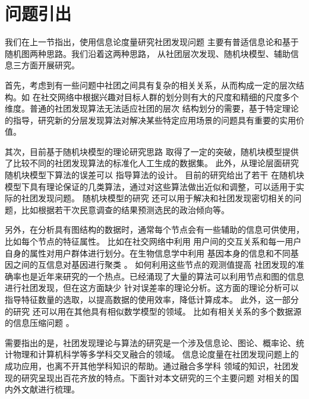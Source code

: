 \section{问题引出}
我们在上一节指出，使用信息论度量研究社团发现问题
主要有普适信息论和基于随机图两种思路。我们沿着这两种思路，
从社团层次发现、随机块模型、辅助信息三方面开展研究。




首先，考虑到有一些问题中社团之间具有复杂的相关关系，从而构成一定的层次结构。如
在社交网络中根据兴趣对目标人群的划分则有大的尺度和精细的尺度多个维度。普通的社团发现算法无法适应社团的层次
结构划分的需要，基于特定理论的指导，研究新的分层发现算法对解决某些特定应用场景的问题具有重要的实用价值。

其次，目前基于随机块模型的理论研究思路
取得了一定的突破，随机块模型提供了比较不同的社团发现算法的标准化人工生成的数据集。
此外，从理论层面研究随机块模型下算法的误差可以
指导算法的设计。
目前的研究给出了若干
在随机块模型下具有理论保证的几类算法，通过对这些算法做出近似和调整，可以适用于实际的社团发现问题。
随机块模型的研究
还可以用于解决和社团发现密切相关的问题，比如根据若干次民意调查的结果预测选民的政治倾向等。

另外，在分析具有图结构的数据时，通常每个节点会有一些辅助的信息可供使用，比如每个节点的特征属性。
比如在社交网络中利用
用户间的交互关系和每一用户自身的属性对用户群体进行划分。在生物信息学中利用
基因本身的信息和不同基因之间的互信息对基因进行聚类 \cite{4359897}。
如何利用这些节点的观测值提高
社团发现的准确率也是近年来研究的一个热点。已经涌现了大量的算法可以利用节点和图的信息进行社团发现，但在这方面缺少
针对误差率的理论分析。这方面的理论分析可以指导特征数量的选取，以提高数据的使用效率，降低计算成本。
此外，这一部分的研究
还可以用在其他具有相似数学模型的领域。
比如有相关关系的多个数据源的信息压缩问题
\cite{abbe17sideinfo}。


需要指出的是，社团发现理论与算法的研究是一个涉及信息论、图论、概率论、统计物理和计算机科学等多学科交叉融合的领域。
信息论度量在社团发现问题上的成功应用，也离不开其他学科知识的帮助。通过融合多学科
领域的知识，社团发现的研究呈现出百花齐放的特点。下面针对本文研究的三个主要问题
对相关的国内外文献进行梳理。

